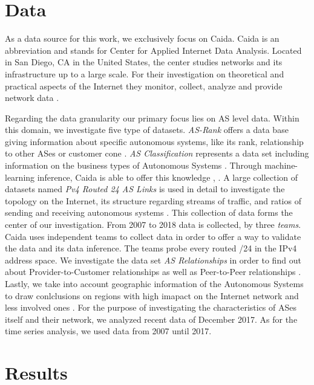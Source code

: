 \documentclass[conference, 11pt]{IEEEtran}
\begin{document}
\section{Data}
As a data source for this work, we exclusively focus on Caida. Caida is an abbreviation and stands for Center for Applied Internet Data Analysis. Located in San Diego, CA in the United States, the center studies networks and its infrastructure up to a large scale. For their investigation on theoretical and practical aspects of the Internet they monitor, collect, analyze and provide network data \cite{Caida}. \\  \linebreak

Regarding the data granularity our primary focus lies on AS level data. Within this domain, we investigate five type of datasets. \textit{AS-Rank} offers a data base giving information about specific autonomous systems, like its rank, relationship to other ASes or customer cone  \cite{Rank} . \textit{AS Classification} represents a data set including information on the business types of Autonomous Systems \cite{Classification}. Through machine-learning inference, Caida is able to offer this knowledge  \cite{Classification}, \cite{dataInference}. A large collection of datasets named \textit{Pv4 Routed 24 AS Links} is used in detail to investigate the topology on the Internet, its structure regarding streams of traffic, and ratios of sending and receiving autonomous systems  \cite{IPv4Data}. This collection of data forms the center of our investigation. From 2007 to 2018 data is collected, by three \textit{teams}. Caida uses independent teams to collect data in order to offer a way to validate the data and its data inference. The teams probe every routed /24 in the IPv4 address space.
We investigate the data set \textit{AS Relationships} in order to find out about Provider-to-Customer relationships as well as Peer-to-Peer relationships \cite{CaidaRelationshipsData}.  Lastly, we take into account geographic information of the Autonomous Systems to draw conlclusions on regions with high imapact on the Internet network and less involved ones  \cite{CaidaGeoData}. For the purpose of investigating the characteristics of ASes itself and their network, we analyzed recent data of December 2017.  As for the time series analysis, we used data from 2007 until 2017. \\


\section{Results}
\end{document}
